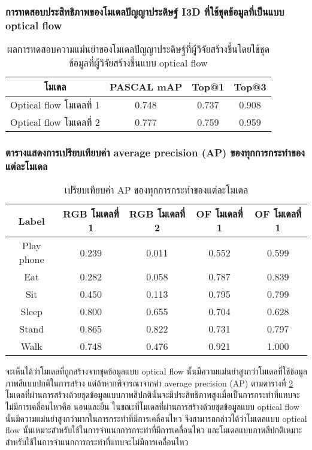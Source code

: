 \subsubsection{การทดสอบประสิทธิภาพของโมเดลปัญญาประดิษฐ์ I3D ที่ใช้ชุดข้อมูลที่เป็นแบบ optical flow}
\begin{table}[!ht]
	\centering
	\begin{tabular}{|c|c|c|c|}
			\hline
			{โมเดล}	&	{PASCAL mAP}	&	{Top@1}	&	{Top@3}\\
			\hline
			Optical flow โมเดลที่ 1	& 0.748	& 0.737	& 0.908	\\
			Optical flow โมเดลที่ 2	& 0.777	& 0.759	& 0.959	\\
			\hline
	\end{tabular}
\caption{ผลการทดสอบความแม่นยำของโมเดลปัญญาประดิษฐ์ที่ผู้วิจัยสร้างขึ้นโดยใช้ชุดข้อมูลที่ผู้วิจัยสร้างขึ้นแบบ optical flow}
\label{tab:I3D_OF_performance}
\end{table}


\subsubsection{ตารางแสดงการเปรียบเทียบค่า average precision (AP) ของทุกการกระทำของแต่ละโมเดล}
\label{sec:I3D_AP}
\begin{table}[!ht]
	\centering
	\begin{tabular}{|c|c|c|c|c|}
			\hline
			{Label} & {RGB โมเดลที่ 1} & {RGB โมเดลที่ 2} & {OF โมเดลที่ 1} & {OF โมเดลที่ 1}\\
			\hline
			Play phone  & 0.239 & 0.011 & 0.552 & 0.599	\\
			Eat			& 0.282	& 0.058	& 0.787	& 0.839	\\
			Sit		 	& 0.450 & 0.113 & 0.795 & 0.799	\\
			Sleep		& 0.800	& 0.655	& 0.704	& 0.628	\\
			Stand		& 0.865	& 0.822	& 0.731	& 0.797	\\
			Walk		& 0.748	& 0.476	& 0.921	& 1.000	\\
			\hline
	\end{tabular}
\caption{เปรียบเทียบค่า AP ของทุกการกระทำของแต่ละโมเดล}
\label{tab:I3D_RGB_OF_AP}
\end{table}
จะเห็นได้ว่าโมเดลที่ถูกสร้างจากชุดข้อมูลแบบ optical flow นั้นมีความแม่นยำสูงกว่าโมเดลที่ใช้ข้อมูลภาพสีแบบปกติในการสร้าง แต่ถ้าหากพิจารณาจากค่า average precision (AP) 
ตามตารางที่ \ref{tab:I3D_RGB_OF_AP} โมเดลที่ผ่านการสร้างด้วยชุดข้อมูลแบบภาพสีปกตินั้นจะมีประสิทธิภาพสูงเมื่อเป็นการกระทำที่แทบจะไม่มีการเคลื่อนไหวคือ นอนและยืน 
ในขณะที่โมเดลที่ผ่านการสร้างด้วยชุดข้อมูลแบบ optical flow นั้นมีความแม่นยำสูงกว่ามากในการกระทำที่มีการเคลื่อนไหว จึงสามารถกล่าวได้ว่าโมเดลแบบ optical flow 
นั้นเหมาะสำหรับใช้ในการจำแนกการกระทำที่มีการเคลื่อนไหว และโมเดลแบบภาพสีปกติเหมาะสำหรับใช้ในการจำแนกการกระทำที่แทบจะไม่มีการเคลื่อนไหว

